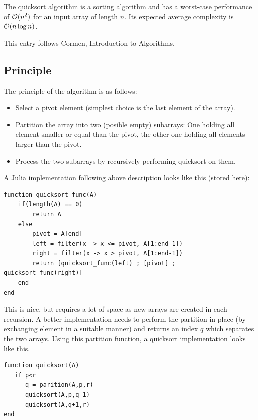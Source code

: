 
The quicksort algorithm is a sorting algorithm and has a worst-case performance of $\mathcal{O}(n^2)$ for an input array of length $n$. Its expected average complexity is $\mathcal{O}(n \log n)$.

This entry follows Cormen, Introduction to Algorithms.

\subsection{Principle}

The principle of the algorithm is as follows:

\begin{itemize}
  \item Select a pivot element (simplest choice is the last element of the array).
  \item Partition the array into two (posible empty) subarrays: One holding all element smaller or equal than the pivot, the other one holding all elements larger than the pivot.
  \item Process the two subarrays by recursively performing quicksort on them.
\end{itemize}

A Julia implementation following above description looks like this (stored \href{https://github.com/ClemensFMN/JuliaStuff/blob/master/algorithms/quicksort.jl}{here}):

\begin{verbatim}
function quicksort_func(A)
    if(length(A) == 0)
        return A
    else
        pivot = A[end]
        left = filter(x -> x <= pivot, A[1:end-1])
        right = filter(x -> x > pivot, A[1:end-1])
        return [quicksort_func(left) ; [pivot] ; quicksort_func(right)]
    end
end
\end{verbatim}

This is nice, but requires a lot of space as new arrays are created in each recursion. A better implementation needs to perform the partition in-place (by exchanging element in a suitable manner) and returns an index $q$ which separates the two arrays. Using this partition function, a quicksort implementation looks like this.

\begin{verbatim}
function quicksort(A)
   if p<r
      q = parition(A,p,r)
      quicksort(A,p,q-1)
      quicksort(A,q+1,r)
end
\end{verbatim}


